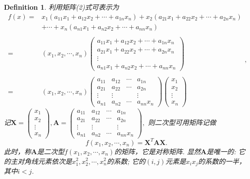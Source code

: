 \documentclass{article}
\newtheorem{definition}[theorem]{Definition}
\newcommand{\mbf}[1]{\bm{#1}}
\begin{document}
\begin{definition}
\rm 利用矩阵(2)式可表示为
$$
\begin{array}{rl}
f(x) =& x_1(a_{11}x_1 + a_{12}x_2 + \cdots + a_{1n}x_n) + x_2(a_{21}x_1 + a_{22}x_2 + \cdots + a_{2n}x_n) \\ 
&+ \cdots + x_n(a_{n1}x_1 + a_{n2}x_2 + \cdots + a_{nn}x_n) \\ \\
=&(x_1,x_2,\cdots,x_n)
\begin{pmatrix}
a_{11}x_1 + a_{12}x_2 + \cdots + a_{1n}x_n \\
a_{21}x_1 + a_{22}x_2 + \cdots + a_{2n}x_n \\
\vdots \\
a_{n1}x_1 + a_{n2}x_2 + \cdots + a_{nn}x_n
\end{pmatrix} \\ \\
=& (x_1,x_2,\cdots,x_n) 
\begin{pmatrix}
a_{11} & a_{12} & \cdots & a_{1n} \\
a_{21} & a_{22} & \cdots & a_{2n} \\
\vdots & \vdots & 		 & \vdots \\
a_{n1} & a_{n2} & \cdots & a_{nn}x_n
\end{pmatrix}
\begin{pmatrix}
x_1 \\
x_2 \\
\vdots \\
x_n
\end{pmatrix}
\end{array},
$$
记$\mbf{X} = \begin{pmatrix}
x_1 \\
x_2 \\
\vdots \\
x_n
\end{pmatrix}, \mbf{A} = \begin{pmatrix}
a_{11} & a_{12} & \cdots & a_{1n} \\
a_{21} & a_{22} & \cdots & a_{2n} \\
\vdots & \vdots & 		 & \vdots \\
a_{n1} & a_{n2} & \cdots & a_{nn}x_n
\end{pmatrix},$
则二次型可用矩阵记做
$$
f(x_1,x_2,\cdots,x_n)=\mbf{X}^T\mbf{A}\mbf{X}.
$$
此时，称$\mbf{A}$是二次型$f(x_1,x_2,\cdots,x_n)$的矩阵，它是对称矩阵. 显然$\mbf{A}$是唯一的: 它的主对角线元素依次是$x_1^2,x_2^2,\cdots,x_n^2$的系数; 它的$(i,j)$元素是$x_ix_j$的系数的一半，其中$i<j$. 
\end{definition}
\end{document}
